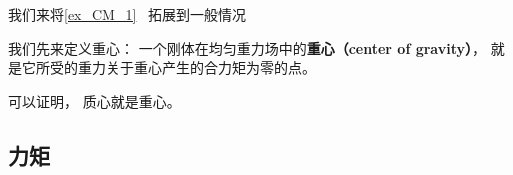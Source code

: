 
\begin{issues}
\issueDraft
\end{issues}


我们来将\autoref{ex_CM_1}~ 拓展到一般情况

我们先来定义重心： 一个刚体在均匀重力场中的\textbf{重心（center of gravity）}， 就是它所受的重力关于重心产生的合力矩为零的点。

可以证明， 质心就是重心。

\subsection{力矩}
